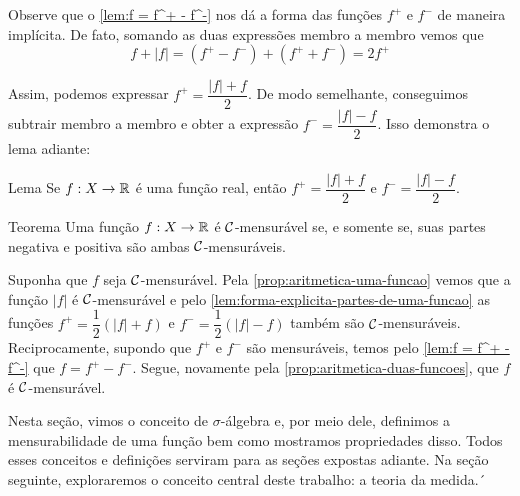 Observe que o \ref{lem:f = f^+ - f^-} nos dá a forma das funções $f^+$ e $f^-$ de maneira implícita.
De fato, somando as duas expressões membro a membro vemos que
\vspace{-0.2cm}
$$f + |f| = (f^+ - f^-) + (f^+ + f^-) = 2f^+$$

\vspace{-0.2cm}
Assim, podemos expressar $f^+ = \dfrac{|f| + f}{2}$.
De modo semelhante, conseguimos subtrair membro a membro e obter a expressão $f^- = \dfrac{|f| - f}{2}$. 
Isso demonstra o lema adiante:
\begin{env}{Lema}
\label{lem:forma-explicita-partes-de-uma-funcao}
    Se $f: X \to \mathbb{R}$ é uma função real, então $f^+ = \dfrac{|f| + f}{2}$ e $f^- = \dfrac{|f| - f}{2}$.
    \vspace{-0.2cm}
\end{env}
\begin{env}{Teorema}
    Uma função $f: X \to \mathbb{R}$ é $\operatorname{\mathcal{C}}$-mensurável se, e somente se, suas partes negativa e positiva são ambas $\operatorname{\mathcal{C}}$-mensuráveis. 
    \vspace{-0.2cm}
\end{env}
    \begin{prova}
        Suponha que $f$ seja $\operatorname{\mathcal{C}}$-mensurável.
        Pela  \ref{prop:aritmetica-uma-funcao} vemos que a função $|f|$ é $\operatorname{\mathcal{C}}$-mensurável e pelo \ref{lem:forma-explicita-partes-de-uma-funcao} as funções $f^+ = \dfrac{1}{2}(|f| + f)$ e $f^- = \dfrac{1}{2}(|f| - f)$ também são $\operatorname{\mathcal{C}}$-mensuráveis.
        Reciprocamente, supondo que $f^+$ e $f^-$ são mensuráveis, temos pelo \ref{lem:f = f^+ - f^-} que
        $f = f^+ - f^-$. Segue, novamente pela \ref{prop:aritmetica-duas-funcoes}, que $f$ é $\operatorname{\mathcal{C}}$-mensurável. 
    \end{prova}

Nesta seção, vimos o conceito de $\sigma$-álgebra e, por meio dele, definimos a mensurabilidade de uma função bem como mostramos propriedades disso.
Todos esses conceitos e definições serviram para as seções expostas adiante. 
Na seção seguinte, exploraremos o conceito central deste trabalho: a teoria da medida.´ 